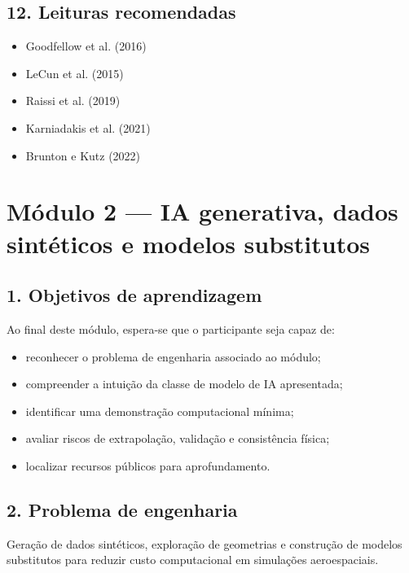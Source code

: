 \documentclass[
  brazilian,
  a4paper,
  DIV=11,
  numbers=noendperiod]{scrreprt}
\providecommand{\tightlist}{%
  \setlength{\itemsep}{0pt}\setlength{\parskip}{0pt}}
\begin{document}
\section{12. Leituras recomendadas}\label{leituras-recomendadas}

\begin{itemize}
\tightlist
\item
  Goodfellow et al. (2016)
\item
  LeCun et al. (2015)
\item
  Raissi et al. (2019)
\item
  Karniadakis et al. (2021)
\item
  Brunton e Kutz (2022)
\end{itemize}

\chapter{Módulo 2 --- IA generativa, dados sintéticos e modelos
substitutos}\label{muxf3dulo-2-ia-generativa-dados-sintuxe9ticos-e-modelos-substitutos}

\section{1. Objetivos de
aprendizagem}\label{objetivos-de-aprendizagem-1}

Ao final deste módulo, espera-se que o participante seja capaz de:

\begin{itemize}
\tightlist
\item
  reconhecer o problema de engenharia associado ao módulo;
\item
  compreender a intuição da classe de modelo de IA apresentada;
\item
  identificar uma demonstração computacional mínima;
\item
  avaliar riscos de extrapolação, validação e consistência física;
\item
  localizar recursos públicos para aprofundamento.
\end{itemize}

\section{2. Problema de engenharia}\label{problema-de-engenharia-1}

Geração de dados sintéticos, exploração de geometrias e construção de
modelos substitutos para reduzir custo computacional em simulações
aeroespaciais.
\end{document}

